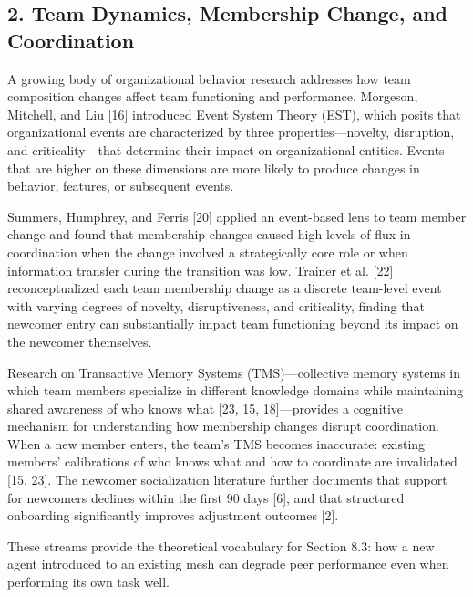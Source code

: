 \subsection{2.  Team Dynamics, Membership Change, and Coordination}

A growing body of organizational behavior research addresses how team composition changes affect team functioning and performance. Morgeson, Mitchell, and Liu [16] introduced Event System Theory (EST), which posits that organizational events are characterized by three properties---novelty, disruption, and criticality---that determine their impact on organizational entities. Events that are higher on these dimensions are more likely to produce changes in behavior, features, or subsequent events.

Summers, Humphrey, and Ferris [20] applied an event-based lens to team member change and found that membership changes caused high levels of flux in coordination when the change involved a strategically core role or when information transfer during the transition was low. Trainer et al. [22] reconceptualized each team membership change as a discrete team-level event with varying degrees of novelty, disruptiveness, and criticality, finding that newcomer entry can substantially impact team functioning beyond its impact on the newcomer themselves.

Research on Transactive Memory Systems (TMS)---collective memory systems in which team members specialize in different knowledge domains while maintaining shared awareness of who knows what [23, 15, 18]---provides a cognitive mechanism for understanding how membership changes disrupt coordination. When a new member enters, the team's TMS becomes inaccurate: existing members' calibrations of who knows what and how to coordinate are invalidated [15, 23]. The newcomer socialization literature further documents that support for newcomers declines within the first 90 days [6], and that structured onboarding significantly improves adjustment outcomes [2].

These streams provide the theoretical vocabulary for Section 8.3: how a new agent introduced to an existing mesh can degrade peer performance even when performing its own task well.


